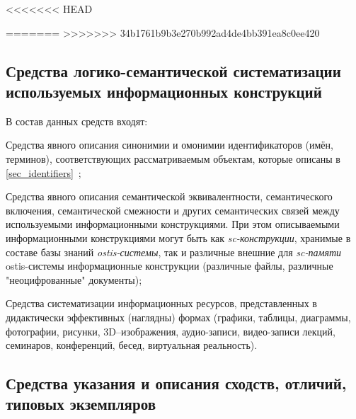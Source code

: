 \begin{SCn}
<<<<<<< HEAD
\begin{SCn}
\end{SCn}

\begin{SCn}
\end{SCn}

=======
>>>>>>> 34b1761b9b3e270b992ad4de4bb391ea8c0ee420
\newpage
\subsection{Средства логико-семантической систематизации используемых информационных конструкций}
\label{subsec_means_logical-semantic_systematization_used_information_structures}

В состав данных средств входят:
\begin{textitemize}
	\item Средства явного описания синонимии и омонимии идентификаторов (имён, терминов), соответствующих рассматриваемым объектам, которые описаны в \ref{sec_identifiers}~;
	\item Средства явного описания семантической эквивалентности, семантического включения, семантической смежности и других семантических связей между используемыми информационными конструкциями. При этом описываемыми информационными конструкциями могут быть как \textit{sc-конструкции}, хранимые в составе базы знаний \textit{ostis-системы}, так и различные внешние для \textit{sc-памяти} ostis-системы информационные конструкции (различные файлы, различные "неоцифрованные"{} документы);
	\item Средства систематизации информационных ресурсов, представленных в дидактически эффективных (наглядны) формах (графики, таблицы, диаграммы, фотографии, рисунки, 3D--изображения, аудио-записи, видео-записи лекций, семинаров, конференций, бесед, виртуальная реальность).
\end{textitemize}

\newpage
\subsection{Средства указания и описания сходств, отличий, типовых экземпляров}
\label{subsec_means_indicating_similarities_differences_specimens}


\end{SCn}
